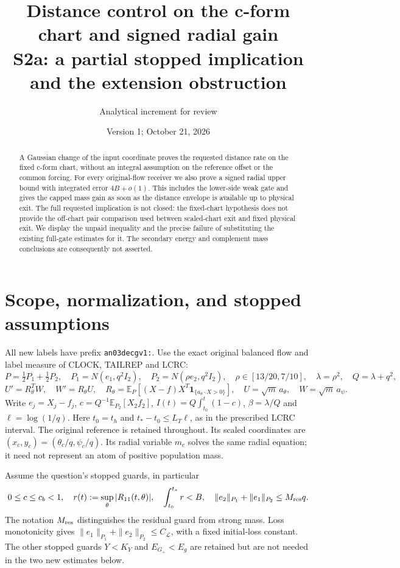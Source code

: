 \documentclass[11pt]{article}
\title{Distance control on the c-form chart and signed radial gain\\
S2a: a partial stopped implication and the extension obstruction}
\author{Analytical increment for review}
\date{Version 1; October 21, 2026}
\theoremstyle{remark}\newtheorem{remark}[proposition]{Remark}
\newcommand{\E}{\mathbb E}
\newcommand{\one}{\mathbf1}
\begin{document}
\maketitle
\begin{abstract}
A Gaussian change of the input coordinate proves the requested
distance rate on the fixed c-form chart, without an integral
assumption on the reference offset or the common forcing.
For every original-flow receiver we also prove a signed radial
upper bound with integrated error $4B+o(1)$. This includes
the lower-side weak gate and gives the capped mass gain as soon
as the distance envelope is available up to physical exit.
The full requested implication is not closed: the fixed-chart
hypothesis does not provide the off-chart pair comparison used
between scaled-chart exit and fixed physical exit. We display
the unpaid inequality and the precise failure of substituting
the existing full-gate estimates for it. The secondary energy
and complement mass conclusions are consequently not asserted.
\end{abstract}

\section{Scope, normalization, and stopped assumptions}
All new labels have prefix \texttt{an03decgv1:}.
Use the exact original balanced flow and label measure of CLOCK,
TAILREP and LCRC:
\[
 P=\tfrac12P_1+\tfrac12P_2,\quad
 P_1=N(e_1,q^2I_2),\quad P_2=N(\rho e_2,q^2I_2),\quad
 \rho\in[13/20,7/10],\quad \lambda=\rho^2,\quad Q=\lambda+q^2,
\]
\[
 U'=R_\theta^TW,\quad W'=R_\theta U,\quad
 R_\theta=\E_P[(X-f)X^T\one_{\{a_\theta\cdot X>0\}}],
 \quad U=\sqrt m\,a_\theta,\quad W=\sqrt m\,a_\psi.
\]
Write $e_j=X_j-f_j$, $c=Q^{-1}\E_{P_2}[X_2f_2]$,
$I(t)=Q\int_{t_0}^t(1-c)$, $\beta=\lambda/Q$ and
$\ell=\log(1/q)$. Here $t_0=t_h$ and
$t_*-t_0\le L_T\ell$, as in the prescribed LCRC interval.
The original reference is retained throughout. Its scaled
coordinates are $(x_c,y_c)=(\theta_c/q,\psi_c/q)$.
Its radial variable $m_c$ solves the same radial equation; it
need not represent an atom of positive population mass.

Assume the question's stopped guards, in particular
\begin{equation}
 0\le c\le c_b<1,\quad
 r(t):=\sup_\theta|R_{11}(t,\theta)|,\quad \int_{t_0}^{t_*}r<B,
 \quad \|e_2\|_{P_1}+\|e_1\|_{P_2}\le M_{\rm res}q.
 \label{an03decgv1:guards}
\end{equation}
The notation $M_{\rm res}$ distinguishes the residual guard from
strong mass. Loss monotonicity gives
$\|e_1\|_{P_1}+\|e_2\|_{P_2}\le C_{\mathcal L}$, with a
fixed initial-loss constant. The other stopped guards
$Y<K_Y$ and $E_{G_+}<E_g$ are retained but are not needed
in the two new estimates below.
\end{document}
